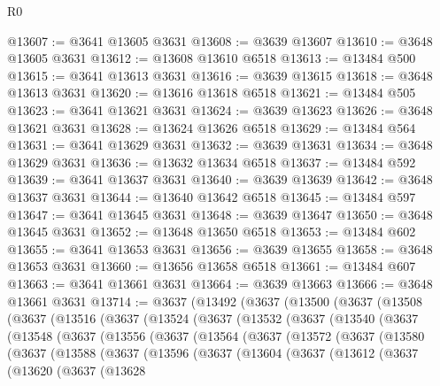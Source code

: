 \begin{lexlean}{R0}
\begin{coremodule}
@13607 := @3641 @13605 @3631
@13608 := @3639 @13607
@13610 := @3648 @13605 @3631
@13612 := @13608 @13610 @6518
@13613 := @13484 @500
@13615 := @3641 @13613 @3631
@13616 := @3639 @13615
@13618 := @3648 @13613 @3631
@13620 := @13616 @13618 @6518
@13621 := @13484 @505
@13623 := @3641 @13621 @3631
@13624 := @3639 @13623
@13626 := @3648 @13621 @3631
@13628 := @13624 @13626 @6518
@13629 := @13484 @564
@13631 := @3641 @13629 @3631
@13632 := @3639 @13631
@13634 := @3648 @13629 @3631
@13636 := @13632 @13634 @6518
@13637 := @13484 @592
@13639 := @3641 @13637 @3631
@13640 := @3639 @13639
@13642 := @3648 @13637 @3631
@13644 := @13640 @13642 @6518
@13645 := @13484 @597
@13647 := @3641 @13645 @3631
@13648 := @3639 @13647
@13650 := @3648 @13645 @3631
@13652 := @13648 @13650 @6518
@13653 := @13484 @602
@13655 := @3641 @13653 @3631
@13656 := @3639 @13655
@13658 := @3648 @13653 @3631
@13660 := @13656 @13658 @6518
@13661 := @13484 @607
@13663 := @3641 @13661 @3631
@13664 := @3639 @13663
@13666 := @3648 @13661 @3631
@13714 := @3637
    (@13492
      (@3637
        (@13500
          (@3637
            (@13508
              (@3637
                (@13516
                  (@3637
                    (@13524
                      (@3637
                        (@13532
                          (@3637
                            (@13540
                              (@3637
                                (@13548
                                  (@3637
                                    (@13556
                                      (@3637
                                        (@13564
                                          (@3637
                                            (@13572
                                              (@3637
                                                (@13580
                                                  (@3637
                                                    (@13588
                                                      (@3637
                                                        (@13596
                                                          (@3637
                                                            (@13604
                                                              (@3637
                                                                (@13612
                                                                  (@3637
                                                                    (@13620
                                                                      (@3637
                                                                        (@13628

\end{coremodule}
\end{lexlean}
